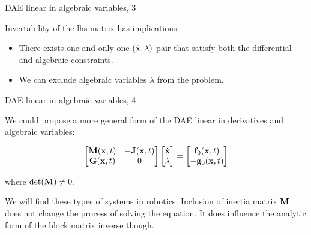 \documentclass{beamer}
\begin{document}
\begin{frame}{DAE linear in algebraic variables, 3}
	\begin{flushleft}
		
		Invertability of the lhs matrix has implications:
		
		\begin{itemize}
			\item There exists one and only one $(\dot{\mathbf{x}}, \lambda)$ pair that satisfy both the differential and algebraic constraints.
			
			\item We can exclude algebraic variables $\lambda$ from the problem.
		\end{itemize}
		
	\end{flushleft}
\end{frame}



\begin{frame}{DAE linear in algebraic variables, 4}
	\begin{flushleft}
		
		We could propose a more general form of the DAE linear in derivatives and algebraic variables:
		
		\begin{equation}
			\begin{bmatrix}
				\mathbf{M}(\mathbf{x}, t) & -\mathbf{J}(\mathbf{x}, t) \\
				\mathbf{G}(\mathbf{x}, t) & 0
			\end{bmatrix}
			\begin{bmatrix}
				\dot{\mathbf{x}} \\ \lambda
			\end{bmatrix}
			=
			\begin{bmatrix}
				\mathbf{f}_0(\mathbf{x}, t) \\
				-\mathbf{g}_0(\mathbf{x}, t)
			\end{bmatrix}
		\end{equation}
		
		where $\text{det} (\mathbf{M}) \neq 0$. 
		
		\bigskip
		
		We will find these types of systems in robotics. Inclusion of inertia matrix $\mathbf{M}$ does not change the process of solving the equation. It does influence the analytic form of the block matrix inverse though.
		
	\end{flushleft}
\end{frame}
\end{document}
